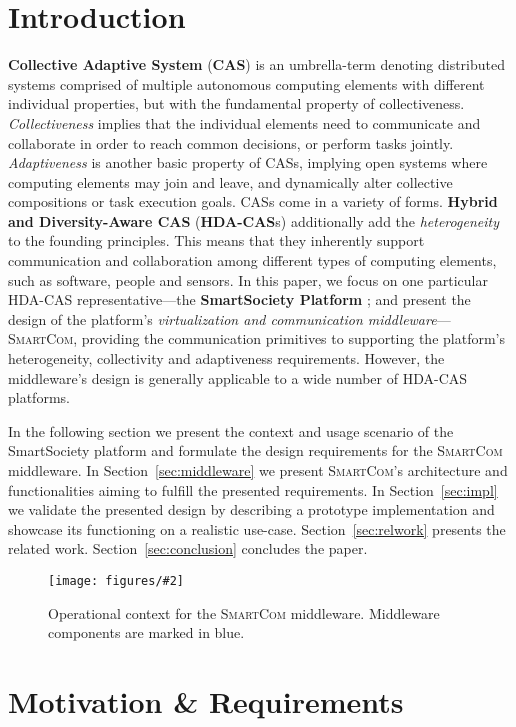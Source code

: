 \documentclass{llncs}
\newcommand{\mdl}{\textsc{SmartCom}}
\newcommand{\figcol}[3][0.9]{
\begin{figure}[H] %
\centering
\texttt{[image: figures/\#2]}
\caption{#3}
\label{fig:#2}
\end{figure}
}
\begin{document}
\section{Introduction}
\label{sec:intro}

  \textbf{Collective Adaptive System} (\textbf{CAS}) \cite{FoCASBook} is an umbrella-term denoting distributed systems comprised of multiple autonomous computing elements with different individual properties, but with the fundamental property of collectiveness. \emph{Collectiveness} implies that the individual elements need to communicate and collaborate in order to reach common decisions, or perform tasks jointly. \emph{Adaptiveness} is another basic property of CASs, implying open systems where computing elements may join and leave, and dynamically alter collective compositions or task execution goals. 
  CASs come in a variety of forms. \textbf{Hybrid and Diversity-Aware CAS} (\textbf{HDA-CAS}s) \cite{fausto} additionally add the \emph{heterogeneity} to the founding principles. This means that they inherently support communication and collaboration among different types of computing elements, such as software, people and sensors. 
  In this paper, we focus on one particular HDA-CAS representative---the \textbf{SmartSociety Platform} \cite{SmartSocBook}; and present the design of the platform's \emph{virtualization and communication middleware}---\mdl{}, providing the communication primitives to supporting the platform's heterogeneity, collectivity and adaptiveness requirements. However, the middleware's design is generally applicable to a wide number of HDA-CAS platforms.

  
  In the following section we present the context and usage scenario of the SmartSociety platform and formulate the design requirements for the \mdl{} middleware. In Section~\ref{sec:middleware} we present \mdl's architecture and functionalities aiming to fulfill the presented requirements. In Section~\ref{sec:impl} we validate the presented design by describing a prototype implementation and showcase its functioning on a realistic use-case. Section~\ref{sec:relwork} presents the related work. Section~\ref{sec:conclusion} concludes the paper.

  \figcol[.75]{smartsoc-highlevel}{Operational context for the \mdl{} middleware. Middleware components are marked in blue.}

  \section{Motivation \& Requirements}
\end{document}

